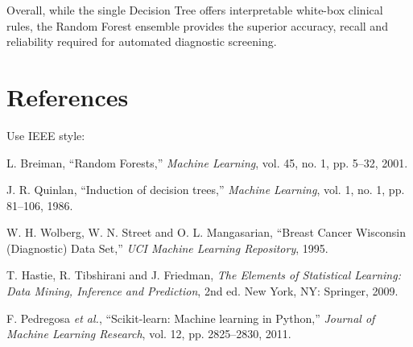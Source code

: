 \documentclass[12pt,a4paper]{article}
\begin{document}
Overall, while the single Decision Tree offers interpretable white-box clinical rules, the Random Forest ensemble provides the superior accuracy, recall and reliability required for automated diagnostic screening.

\section{References}
Use IEEE style:
\begin{enumerate}[label={[\arabic*]}]
\item L. Breiman, ``Random Forests,'' \textit{Machine Learning}, vol. 45, no. 1, pp. 5--32, 2001.
\item J. R. Quinlan, ``Induction of decision trees,'' \textit{Machine Learning}, vol. 1, no. 1, pp. 81--106, 1986.
\item W. H. Wolberg, W. N. Street and O. L. Mangasarian, ``Breast Cancer Wisconsin (Diagnostic) Data Set,'' \textit{UCI Machine Learning Repository}, 1995.
\item T. Hastie, R. Tibshirani and J. Friedman, \textit{The Elements of Statistical Learning: Data Mining, Inference and Prediction}, 2nd ed. New York, NY: Springer, 2009.
\item F. Pedregosa \textit{et al.}, ``Scikit-learn: Machine learning in Python,'' \textit{Journal of Machine Learning Research}, vol. 12, pp. 2825--2830, 2011.
\end{enumerate}
\end{document}
